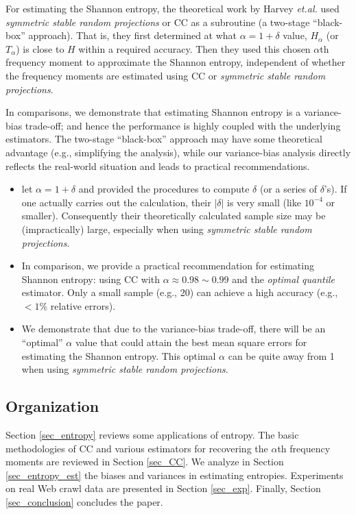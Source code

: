 \documentclass{sig-alternate}
\begin{document}
For estimating the Shannon entropy, the theoretical work by Harvey {\em et.al.}\cite{Article:Harvey_entropy_arXiv08,Proc:Harvey_FOCS08} used {\em symmetric stable random projections} or CC as a subroutine (a two-stage ``black-box'' approach). That is, they first determined at what $\alpha=1+\delta$ value, $H_\alpha$ (or $T_\alpha$) is close to $H$ within a required accuracy. Then they used this chosen $\alpha$th frequency moment to approximate the Shannon entropy, independent of whether the frequency moments are estimated using CC or {\em symmetric stable random projections}.

In comparisons, we demonstrate that  estimating Shannon entropy is  a variance-bias trade-off; and hence the performance is highly coupled with the underlying estimators. The two-stage ``black-box'' approach   \cite{Article:Harvey_entropy_arXiv08,Proc:Harvey_FOCS08} may have  some theoretical advantage (e.g., simplifying the analysis), while our variance-bias analysis directly reflects the real-world situation and leads to practical recommendations.
\begin{itemize}
\item  \cite{Article:Harvey_entropy_arXiv08,Proc:Harvey_FOCS08} let $\alpha = 1+\delta$ and provided the procedures to compute $\delta$ (or a series of $\delta$'s). If one actually carries out the calculation, their $|\delta|$ is very small (like $10^{-4}$ or smaller). Consequently their theoretically calculated sample size may be (impractically) large, especially when using {\em symmetric stable random projections}.
\item In comparison, we  provide a practical recommendation for estimating Shannon entropy: using CC with $\alpha\approx 0.98\sim 0.99$ and the {\em optimal quantile} estimator. Only a  small sample (e.g., 20) can achieve a high accuracy (e.g., $<1\%$ relative errors).
\item We  demonstrate that due to the variance-bias trade-off, there will be an ``optimal'' $\alpha$ value that could attain the best mean square errors for estimating the Shannon entropy. This optimal $\alpha$  can be quite away from 1  when using {\em symmetric stable random projections}.
\end{itemize}

\subsection{Organization}

Section \ref{sec_entropy} reviews  some applications of entropy. The basic methodologies of CC and various estimators for recovering the $\alpha$th frequency moments are reviewed in Section \ref{sec_CC}. We analyze in Section \ref{sec_entropy_est} the biases and variances in estimating entropies.  Experiments on real Web crawl data are presented in Section \ref{sec_exp}. Finally, Section \ref{sec_conclusion} concludes the paper.
\end{document}
